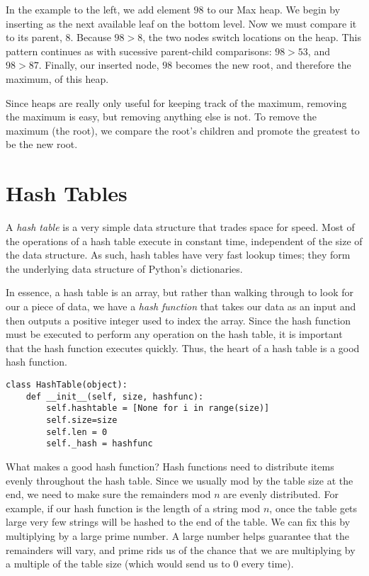 \begin{minipage}{.35\textwidth}
In the example to the left, we add element $98$ to our Max heap.
We begin by inserting as the next available leaf on the bottom level.
Now we must compare it to its parent, $8$. Because $98 > 8$, the two nodes switch locations on the heap. This pattern continues as with sucessive parent-child comparisons: $98 > 53$, and $98 > 87$.
Finally, our inserted node, $98$ becomes the new root, and therefore the maximum, of this heap.
\end{minipage}

Since heaps are really only useful for keeping track of the maximum, removing the maximum is easy, but removing anything else is not.
To remove the maximum (the root), we compare the root's children and promote the greatest to be the new root.

\section*{Hash Tables}
A \emph{hash table} is a very simple data structure that trades space for speed.
Most of the operations of a hash table execute in constant time, independent of the size of the data structure.
As such, hash tables have very fast lookup times; they form the underlying data structure of Python's dictionaries.

In essence, a hash table is an array, but rather than walking through to look for our a piece of data, we have a \emph{hash function} that takes our data as an input and then outputs a positive integer used to index the array.
Since the hash function must be executed to perform any operation on the hash table, it is important that the hash function executes quickly.
Thus, the heart of a hash table is a good hash function.

\begin{lstlisting}
class HashTable(object):
    def __init__(self, size, hashfunc):
        self.hashtable = [None for i in range(size)]
        self.size=size
        self.len = 0
        self._hash = hashfunc
\end{lstlisting}

What makes a good hash function?
Hash functions need to distribute items evenly throughout the hash table.
Since we usually mod by the table size at the end, we need to make sure the remainders mod $n$ are evenly distributed.
For example, if our hash function is the length of a string mod $n$, once the table gets large very few strings will be hashed to the end of the table.
We can fix this by multiplying by a large prime number.
A large number helps guarantee that the remainders will vary, and prime rids us of the chance that we are multiplying by a multiple of the table size (which would send us to 0 every time).

